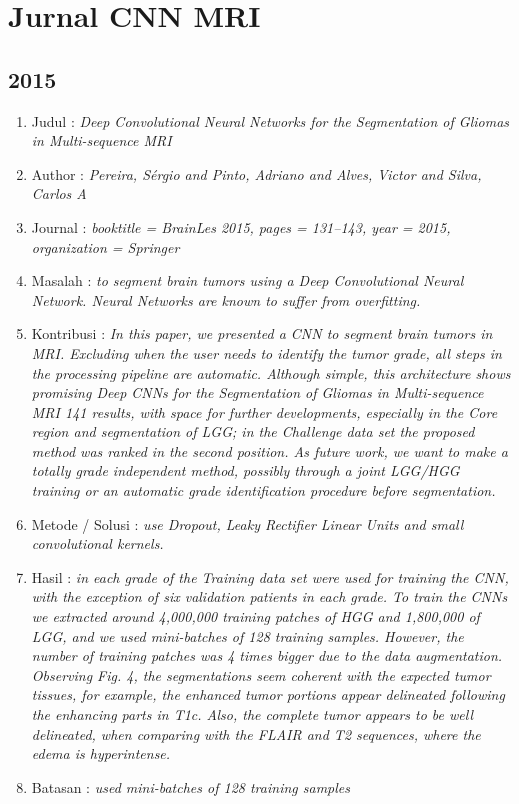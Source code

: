 \section{Jurnal CNN MRI}
\subsection{2015}
\begin{enumerate}
  \item Judul : \textit{Deep Convolutional Neural Networks for the Segmentation of Gliomas in Multi-sequence MRI}
  \item Author : \textit{Pereira, S{\'e}rgio and Pinto, Adriano and Alves, Victor and Silva, Carlos A}
  \item Journal : \textit{booktitle = BrainLes 2015, pages = 131--143, year = 2015, organization = Springer}
  \item Masalah : \textit{to segment brain tumors using a Deep Convolutional Neural Network. Neural Networks are known to suffer from overfitting.}
  \item Kontribusi : \textit{In this paper, we presented a CNN to segment brain tumors in MRI. Excluding when the user needs to identify the tumor grade, all steps in the processing pipeline are automatic. Although simple, this architecture shows promising
Deep CNNs for the Segmentation of Gliomas in Multi-sequence MRI 141
results, with space for further developments, especially in the Core region and
segmentation of LGG; in the Challenge data set the proposed method was ranked
in the second position. As future work, we want to make a totally grade independent method, possibly through a joint LGG/HGG training or an automatic
grade identification procedure before segmentation.}

  \item Metode / Solusi : \textit{use Dropout, Leaky Rectifier Linear Units and small convolutional kernels.} 
  \item Hasil : \textit{in each grade of the Training data set were used for training the CNN, with
the exception of six validation patients in each grade. To train the CNNs we
extracted around 4,000,000 training patches of HGG and 1,800,000 of LGG, and
we used mini-batches of 128 training samples. However, the number of training
patches was 4 times bigger due to the data augmentation. Observing Fig. 4, the
segmentations seem coherent with the expected tumor tissues, for example, the
enhanced tumor portions appear delineated following the enhancing parts in
T1c. Also, the complete tumor appears to be well delineated, when comparing
with the FLAIR and T2 sequences, where the edema is hyperintense.}
  \item Batasan : \textit{used mini-batches of 128 training samples}
\end{enumerate}